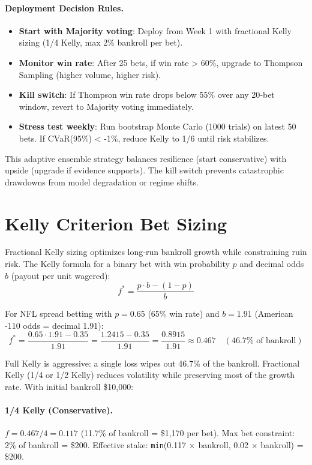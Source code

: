 \paragraph{Deployment Decision Rules.}
\begin{itemize}
\item \textbf{Start with Majority voting}: Deploy from Week 1 with fractional Kelly sizing (1/4 Kelly, max 2\% bankroll per bet).
\item \textbf{Monitor win rate}: After 25 bets, if win rate > 60\%, upgrade to Thompson Sampling (higher volume, higher risk).
\item \textbf{Kill switch}: If Thompson win rate drops below 55\% over any 20‑bet window, revert to Majority voting immediately.
\item \textbf{Stress test weekly}: Run bootstrap Monte Carlo (1000 trials) on latest 50 bets. If CVaR(95\%) < -1\%, reduce Kelly to 1/6 until risk stabilizes.
\end{itemize}

This adaptive ensemble strategy balances resilience (start conservative) with upside (upgrade if evidence supports). The kill switch prevents catastrophic drawdowns from model degradation or regime shifts.

\section{Kelly Criterion Bet Sizing}
\label{sec:kelly_sizing}

Fractional Kelly sizing optimizes long‑run bankroll growth while constraining ruin risk. The Kelly formula for a binary bet with win probability $p$ and decimal odds $b$ (payout per unit wagered):
\[
f^* = \frac{p \cdot b - (1 - p)}{b}
\]

For NFL spread betting with $p = 0.65$ (65\% win rate) and $b = 1.91$ (American -110 odds = decimal 1.91):
\[
f^* = \frac{0.65 \cdot 1.91 - 0.35}{1.91} = \frac{1.2415 - 0.35}{1.91} = \frac{0.8915}{1.91} \approx 0.467 \quad (46.7\% \text{ of bankroll})
\]

Full Kelly is aggressive: a single loss wipes out 46.7\% of the bankroll. Fractional Kelly (1/4 or 1/2 Kelly) reduces volatility while preserving most of the growth rate. With initial bankroll \$10,000:

\paragraph{1/4 Kelly (Conservative).}
$f = 0.467 / 4 = 0.117$ (11.7\% of bankroll = \$1,170 per bet). Max bet constraint: 2\% of bankroll = \$200. Effective stake: \texttt{min}(0.117 × bankroll, 0.02 × bankroll) = \$200.

